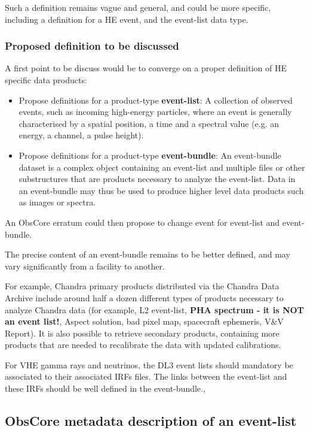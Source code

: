 \documentclass[11pt,a4paper]{ivoa}
\begin{document}
Such a definition remains vague and general, and could be more specific, including a definition for a HE event, and the
event-list data type.

\subsubsection{Proposed definition to be discussed}

A first point to be discuss would be to converge on a proper definition of HE specific data products:
\begin{itemize}
    \item Propose definitions for a product-type \textbf{event-list}: A collection of observed events, such as incoming
    high-energy particles, where an event is generally characterised by a spatial position, a time and a spectral value
    (e.g. an energy, a channel, a pulse height).
    \item Propose definitions for a product-type \textbf{event-bundle}: An event-bundle dataset is a complex object
    containing an event-list and multiple files or other substructures that are products necessary to analyze the
    event-list. Data in an event-bundle may thus be used to produce higher level data products such as images or spectra.
\end{itemize}

An ObsCore erratum could then propose to change event for event-list and event-bundle.

The precise content of an event-bundle remains to be better defined, and may vary significantly from a facility to another.

For example, Chandra primary products distributed via the Chandra Data Archive include around half a dozen different
types of products necessary to analyze Chandra data (for example, L2 event-list, {\bf PHA spectrum - it is NOT an event
list!}, Aspect solution,
bad pixel map, spacecraft ephemeris, V\&V Report). It is also possible to retrieve secondary products,
containing more products that are needed to recalibrate the data with updated calibrations.

For VHE gamma rays and neutrinos, the DL3 event lists should mandatory be associated to their associated IRFs files. The
links between the event-list and these IRFs should be well defined in the event-bundle.,


\subsection{ObsCore metadata description of an event-list}
\label{sec:obscore}
\end{document}
